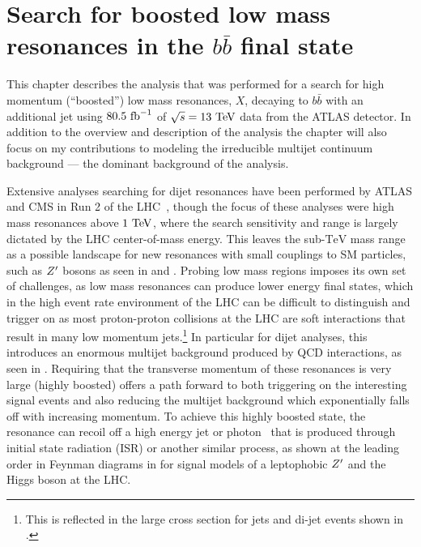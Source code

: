 \chapter{Search for boosted low mass resonances in the $b\bar{b}$ final state}\label{chapter:analysis}

This chapter describes the analysis that was performed for a search for high momentum (``boosted'') low mass resonances, $X$, decaying to $b\bar{b}$ with an additional jet using $80.5~\mathrm{fb}^{-1}$ of $\sqrt{s} = 13~\mathrm{TeV}$ data from the ATLAS detector.
In addition to the overview and description of the analysis the chapter will also focus on my contributions to modeling the irreducible multijet continuum background --- the dominant background of the analysis.

Extensive analyses searching for dijet resonances have been performed by ATLAS and CMS in Run 2 of the LHC~\cite{EXOT-2016-21,CMS-EXO-16-032,CMS-EXO-16-046}, though the focus of these analyses were high mass resonances above $1~\mathrm{TeV}$, where the search sensitivity and range is largely dictated by the LHC center-of-mass energy.
This leaves the sub-$\mathrm{TeV}$ mass range as a possible landscape for new resonances with small couplings to SM particles, such as $Z^{\prime}$ bosons as seen in  and .
Probing low mass regions imposes its own set of challenges, as low mass resonances can produce lower energy final states, which in the high event rate environment of the LHC can be difficult to distinguish and trigger on as most proton-proton collisions at the LHC are soft interactions that result in many low momentum jets.\footnote{%
 This is reflected in the large cross section for jets and di-jet events shown in .}
In particular for dijet analyses, this introduces an enormous multijet background produced by QCD interactions, as seen in .
Requiring that the transverse momentum of these resonances is very large (highly boosted) offers a path forward to both triggering on the interesting signal events and also reducing the multijet background which exponentially falls off with increasing momentum.
To achieve this highly boosted state, the resonance can recoil off a high energy jet or photon~\cite{EXOT-2017-01} that is produced through initial state radiation (ISR) or another similar process, as shown at the leading order in Feynman diagrams in  for signal models of a leptophobic $Z^{\prime}$ and the Higgs boson at the LHC.
